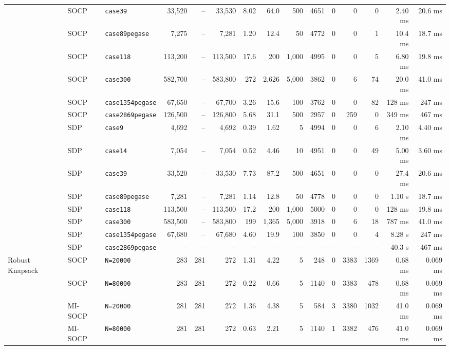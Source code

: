 \documentclass[10pt]{article} %
\theoremstyle{plain}
\theoremstyle{definition}
\theoremstyle{remark}
\begin{document}
\begin{table}
{\begin{tabular}{lll rrr rr r rrrr rr}
   & SOCP & \texttt{case39} & 33,520 & -- & 33,530 & 8.02 & 64.0 & 500 & 4651 & 0 & 0 & 0 & 2.40 ms & 20.6 ms \\
   & SOCP & \texttt{case89pegase} & 7,275 & -- & 7,281 & 1.20 & 12.4 & 50 & 4772 & 0 & 0 & 1 & 10.4 ms & 18.7 ms \\
   & SOCP & \texttt{case118} & 113,200 & -- & 113,500 & 17.6 & 200 & 1,000 & 4995 & 0 & 0 & 5 & 6.80 ms & 19.8 ms \\
   & SOCP & \texttt{case300} & 582,700 & -- & 583,800 & 272 & 2,626 & 5,000 & 3862 & 0 & 6 & 74 & 20.0 ms & 41.0 ms \\
   & SOCP & \texttt{case1354pegase} & 67,650 & -- & 67,700 & 3.26 & 15.6 & 100 & 3762 & 0 & 0 & 82 & 128 ms & 247 ms \\
   & SOCP & \texttt{case2869pegase} & 126,500 & -- & 126,800 & 5.68 & 31.1 & 500 & 2957 & 0 & 259 & 0 & 349 ms & 467 ms \\
   & SDP & \texttt{case9} & 4,692 & -- & 4,692 & 0.39 & 1.62 & 5 & 4994 & 0 & 0 & 6 & 2.10 ms & 4.40 ms \\
   & SDP & \texttt{case14} & 7,054 & -- & 7,054 & 0.52 & 4.46 & 10 & 4951 & 0 & 0 & 49 & 5.00 ms & 3.60 ms \\
   & SDP & \texttt{case39} & 33,520 & -- & 33,530 & 7.73 & 87.2 & 500 & 4651 & 0 & 0 & 0 & 27.4 ms & 20.6 ms \\
   & SDP & \texttt{case89pegase} & 7,281 & -- & 7,281 & 1.14 & 12.8 & 50 & 4778 & 0 & 0 & 0 & 1.10 s & 18.7 ms \\
   & SDP & \texttt{case118} & 113,500 & -- & 113,500 & 17.2 & 200 & 1,000 & 5000 & 0 & 0 & 0 & 128 ms & 19.8 ms \\
   & SDP & \texttt{case300} & 583,500 & -- & 583,800 & 199 & 1,365 & 5,000 & 3918 & 0 & 6 & 18 & 787 ms & 41.0 ms \\
   & SDP & \texttt{case1354pegase} & 67,680 & -- & 67,680 & 4.60 & 19.9 & 100 & 3850 & 0 & 0 & 4 & 8.28 s & 247 ms \\
   & SDP & \texttt{case2869pegase} & -- & -- & -- & -- & -- & -- & -- & -- & -- & -- & 40.3 s & 467 ms \\
\midrule
  \multirow{4}{*}{Robust Knapsack} & SOCP & \texttt{N=20000} & 283 & 281 & 272 & 1.31 & 4.22 & 5 & 248 & 0 & 3383 & 1369 & 0.68 ms & 0.069 ms \\
   & SOCP & \texttt{N=80000} & 283 & 281 & 272 & 0.22 & 0.66 & 5 & 1140 & 0 & 3383 & 478 & 0.68 ms & 0.069 ms \\
   & MI-SOCP & \texttt{N=20000} & 281 & 281 & 272 & 1.36 & 4.38 & 5 & 584 & 3 & 3380 & 1032 & 41.0 ms & 0.069 ms \\
   & MI-SOCP & \texttt{N=80000} & 281 & 281 & 272 & 0.63 & 2.21 & 5 & 1140 & 1 & 3382 & 476 & 41.0 ms & 0.069 ms \\
\bottomrule
\end{tabular}%
}
\end{table}
\end{document}
